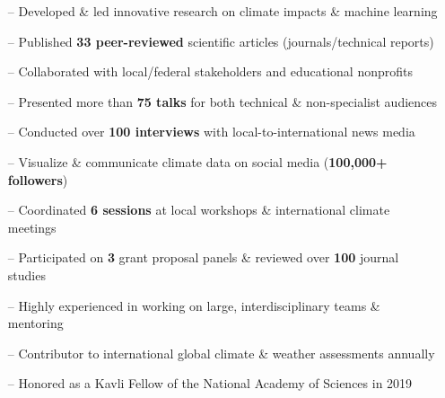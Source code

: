 \documentclass[10pt,a4paper]{altacv}
\begin{document}

%

\begin{fullwidth}
\makecvheader
\end{fullwidth}

%

\vspace{-0.09in}
\begin{itemize}
    \setlength{\itemindent}{0.5em}
    \item[--] \small{Developed \& led innovative research on climate impacts \& machine learning}
    \item[--] \small{Published \textbf{33 peer-reviewed} scientific articles (journals/technical reports)}
    \item[--] \small{Collaborated with local\slash federal stakeholders and educational nonprofits}
    \item[--] \small{Presented more than \textbf{75 talks} for both technical \& non-specialist audiences}
    \item[--] \small{Conducted over \textbf{100 interviews} with local-to-international news media}
    \item[--] \small{Visualize \& communicate climate data on social media (\textbf{100,000+ followers})}
    \item[--] \small{Coordinated \textbf{6 sessions} at local workshops \& international climate meetings}
    \item[--] \small{Participated on \textbf{3} grant proposal panels \& reviewed over \textbf{100} journal studies}
    \item[--] \small{Highly experienced in working on large, interdisciplinary teams \& mentoring}
    \item[--] \small{Contributor to international global climate \& weather assessments annually}
    \item[--] \small{Honored as a Kavli Fellow of the National Academy of Sciences in 2019}
\end{itemize}
\smallskip
\end{document}

